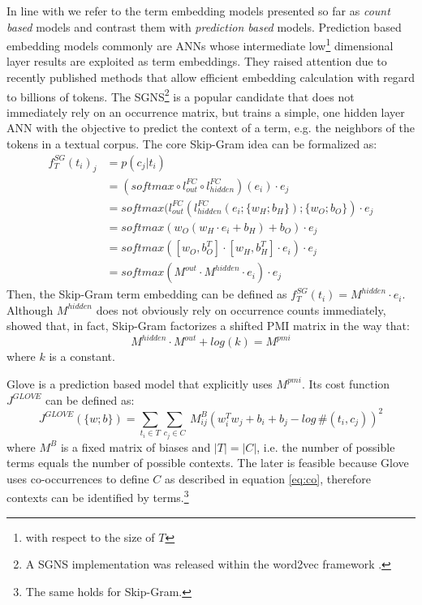 In line with \textcite{levy_improving_2015} we refer to the term embedding models presented so far as \textit{count based} models and contrast them with \textit{prediction based} models. Prediction based embedding models commonly are \ac{ANN}s whose intermediate low\footnote{with respect to the size of $T$} dimensional layer results  are exploited as term embeddings. They raised attention due to recently published methods that allow efficient embedding calculation with regard to billions of tokens. The \ac{SGNS}\footnote{A \ac{SGNS} implementation was released within the word2vec framework \autocite{mikolov_efficient_2013}.} \autocite{mikolov_distributed_2013} is a popular candidate that does not immediately rely on an occurrence matrix, but trains a simple, one hidden layer \acs{ANN} with the objective to predict the context of a term, e.g. the neighbors of the tokens in a textual corpus. The core Skip-Gram idea can be formalized as:
\begin{equation}
\begin{split}
f^{SG}_T(t_i)_j & = p(c_j|t_i) \\
  & = (softmax \circ l^{FC}_{out} \circ l^{FC}_{hidden})(e_i) \cdot e_j \\
  & = softmax(l^{FC}_{out}(l^{FC}_{hidden}(e_i; \{w_{H};b_{H}\}); \{w_{O};b_{O}\}) \cdot e_j \\
  & = softmax(w_{O}(w_{H} \cdot e_i + b_{H}) + b_{O}) \cdot e_j \\
  & = softmax([w_{O},b^T_{O}] \cdot [w_{H},b^T_{H}]\cdot e_i) 
  \cdot e_j \\
  & = softmax(M^{out} \cdot M^{hidden} \cdot e_i) \cdot e_j
\end{split}
\end{equation}
Then, the Skip-Gram term embedding can be defined as $f_T^{SG}(t_i) = M^{hidden} \cdot e_i$. Although $M^{hidden}$ does not obviously rely on occurrence counts immediately, \textcite{levy_neural_2014} showed that, in fact, Skip-Gram factorizes a shifted \ac{PMI} matrix in the way that: 
\begin{equation}
M^{hidden} \cdot M^{out} + log(k) = M^{pmi}
\end{equation}
where $k$ is a constant. 

Glove \autocite{pennington_glove_2014} is a prediction based model that explicitly uses $M^{pmi}$. Its cost function  $J^{GLOVE}$ can be defined as:
\begin{equation}
J^{GLOVE}(\{w; b\}) = \sum\limits_{t_i \in T}\sum\limits_{c_j \in C}\ M^{B}_{ij}(w_i^Tw_j + b_i + b_j - log\,\#(t_i,c_j))^2
\end{equation}
where $M^B$ is a fixed matrix of biases and $|T| = |C|$, i.e. the number of possible terms equals the number of possible contexts. The later is feasible because Glove uses co-occurrences to define $C$ as described in equation \eqref{eq:co}, therefore contexts can be identified by terms.\footnote{The same holds for Skip-Gram.}

